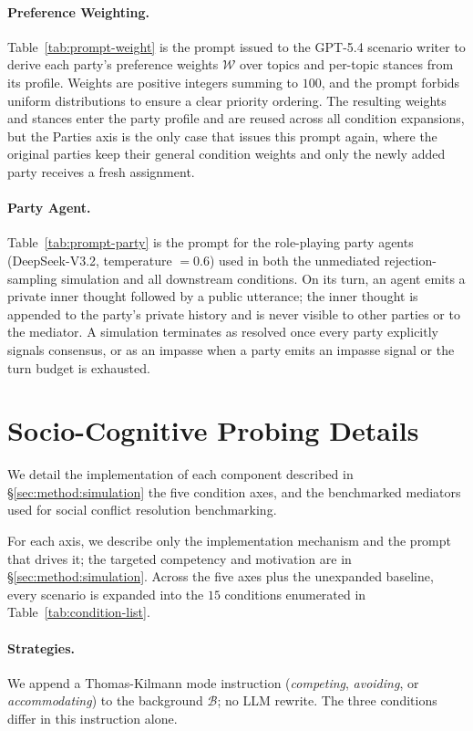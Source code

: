 \documentclass{llmxive}
\begin{document}
\paragraph{Preference Weighting.}
Table~\ref{tab:prompt-weight} is the prompt issued to the GPT-5.4 scenario writer to derive each party's preference weights $\mathcal{W}$ over topics and per-topic stances from its profile. Weights are positive integers summing to $100$, and the prompt forbids uniform distributions to ensure a clear priority ordering. The resulting weights and stances enter the party profile and are reused across all condition expansions, but the Parties axis is the only case that issues this prompt again, where the original parties keep their general condition weights and only the newly added party receives a fresh assignment.

\paragraph{Party Agent.}
Table~\ref{tab:prompt-party} is the prompt for the role-playing party agents (DeepSeek-V3.2, temperature $=0.6$) used in both the unmediated rejection-sampling simulation and all downstream conditions. On its turn, an agent emits a private inner thought followed by a public utterance; the inner thought is appended to the party's private history and is never visible to other parties or to the mediator. A simulation terminates as resolved once every party explicitly signals consensus, or as an impasse when a party emits an impasse signal or the turn budget is exhausted.


\section{Socio-Cognitive Probing Details}
\label{app:probing}

We detail the implementation of each component described in \S\ref{sec:method:simulation} the five condition axes, and the benchmarked mediators used for social conflict resolution benchmarking.


For each axis, we describe only the implementation mechanism and the prompt that drives it; the targeted competency and motivation are in \S\ref{sec:method:simulation}. Across the five axes plus the unexpanded baseline, every scenario is expanded into the $15$ conditions enumerated in Table~\ref{tab:condition-list}.

\paragraph{Strategies.}
We append a Thomas-Kilmann mode instruction (\emph{competing}, \emph{avoiding}, or \emph{accommodating}) to the background $\mathcal{B}$; no LLM rewrite. The three conditions differ in this instruction alone.
\end{document}
